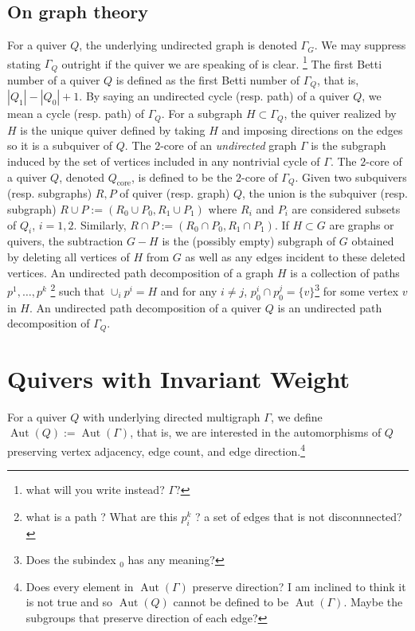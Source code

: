\documentclass[12pt]{amsart}
\theoremstyle{plain}
\theoremstyle{definition}
\DeclareMathOperator{\aut}{Aut}
\begin{document}
\subsection{On graph theory}
For a quiver $Q$, the underlying undirected graph is denoted $\Gamma_G$. We may suppress stating $\Gamma_Q$ outright if the quiver we are speaking of is clear. \footnote{what will you write instead? $\Gamma$?} The first Betti number of a quiver $Q$ is defined as the first Betti number of $\Gamma_Q$, that is, $|Q_1| - |Q_0| + 1$. By saying an undirected cycle (resp. path) of a quiver $Q$,  we mean a cycle (resp. path) of $\Gamma_Q$. For a subgraph $H \subset \Gamma_Q$, the quiver realized by $H$ is the unique quiver defined by taking $H$ and imposing directions on the edges so it is a subquiver of $Q$. The $2$-core of an \textit{undirected} graph $\Gamma$ is the subgraph induced by the set of vertices included in any nontrivial cycle of $\Gamma$. The $2$-core of a quiver $Q$, denoted $Q_{\text{core}}$, is defined to be the $2$-core of $\Gamma_Q$. Given two subquivers (resp. subgraphs) $R, P$ of quiver (resp. graph) $Q$, the union is the subquiver (resp. subgraph) $R \cup P := (R_0 \cup P_0, R_1 \cup P_1)$ where $R_i$ and $P_i$ are considered subsets of $Q_i$, $i = 1, 2$. Similarly, $R \cap P := (R_0 \cap P_0, R_1 \cap P_1)$. If $H \subset G$ are graphs or quivers, the subtraction $G - H$ is the (possibly empty) subgraph of $G$ obtained by deleting all vertices of $H$ from $G$ as well as any edges incident to these deleted vertices. An undirected path decomposition of a graph $H$ is a collection of paths $p^1, \ldots, p^k$ \footnote{what is a path ? What are this $p_i^k$ ? a set of edges that is not disconnnected?} such that $\cup_ip^i = H$ and for any $i \neq j$, $p^i_0 \cap p^j_0 = \{v\}$\footnote{Does the subindex $_0$ has any meaning?} for some vertex $v$ in $H$. An undirected path decomposition of a quiver $Q$ is an undirected path decomposition of $\Gamma_Q$.

\section{Quivers with Invariant Weight}
\noindent For a quiver $Q$ with underlying directed multigraph $\Gamma$, we define $\aut(Q) := \aut(\Gamma)$, that is, we are interested in the automorphisms of $Q$ preserving vertex adjacency, edge count, and edge direction.\footnote{Does every element in $\aut(\Gamma)$  preserve direction? I am inclined to think it is not true and so $\aut(Q)$ cannot be defined to be  $\aut(\Gamma)$. Maybe the subgroups that preserve direction of each edge?  }
\end{document}

